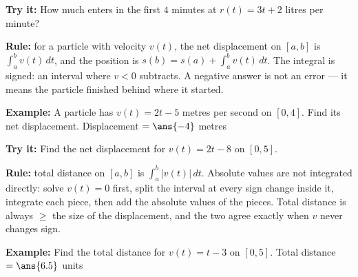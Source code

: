 \documentclass[12pt]{article}
\begin{document}
\begin{tryitbox}
\textbf{Try it:} How much enters in the first $4$ minutes at
$r(t) = 3t + 2$ litres per minute?\\[2pt]
\end{tryitbox}


\begin{formulabox}
\textbf{Rule:} for a particle with velocity $v(t)$, the net displacement on
$[a, b]$ is $\int_a^b v(t)\,dt$, and the position is
$s(b) = s(a) + \int_a^b v(t)\,dt$. The integral is signed: an interval where
$v < 0$ subtracts. A negative answer is not an error --- it means the particle
finished behind where it started.
\end{formulabox}

\begin{examplebox}
\textbf{Example:} A particle has $v(t) = 2t - 5$ metres per second on
$[0, 4]$. Find its net displacement.
Displacement $= \ans{-4}$ metres
\end{examplebox}

\begin{tryitbox}
\textbf{Try it:} Find the net displacement for $v(t) = 2t - 8$ on
$[0, 5]$.\\[2pt]
\end{tryitbox}


\begin{formulabox}
\textbf{Rule:} total distance on $[a, b]$ is $\int_a^b |v(t)|\,dt$. Absolute
values are not integrated directly: solve $v(t) = 0$ first, split the interval
at every sign change inside it, integrate each piece, then add the absolute
values of the pieces. Total distance is always $\ge$ the size of the
displacement, and the two agree exactly when $v$ never changes sign.
\end{formulabox}

\begin{examplebox}
\textbf{Example:} Find the total distance for $v(t) = t - 3$ on $[0, 5]$.
Total distance $= \ans{6.5}$ units
\end{examplebox}
\end{document}
